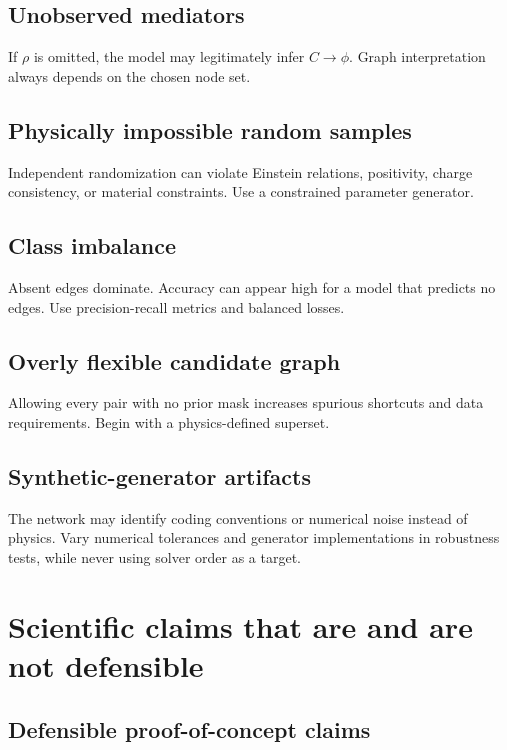 \documentclass[11pt]{article}
\begin{document}
\subsection{Unobserved mediators}

If \(\rho\) is omitted, the model may legitimately infer \(C\rightarrow\phi\). Graph interpretation always depends on the chosen node set.

\subsection{Physically impossible random samples}

Independent randomization can violate Einstein relations, positivity, charge consistency, or material constraints. Use a constrained parameter generator.

\subsection{Class imbalance}

Absent edges dominate. Accuracy can appear high for a model that predicts no edges. Use precision-recall metrics and balanced losses.

\subsection{Overly flexible candidate graph}

Allowing every pair with no prior mask increases spurious shortcuts and data requirements. Begin with a physics-defined superset.

\subsection{Synthetic-generator artifacts}

The network may identify coding conventions or numerical noise instead of physics. Vary numerical tolerances and generator implementations in robustness tests, while never using solver order as a target.

\section{Scientific claims that are and are not defensible}

\subsection{Defensible proof-of-concept claims}
\end{document}
